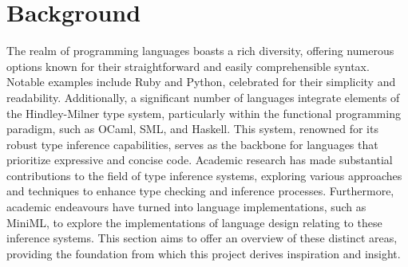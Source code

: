 \documentclass{l4proj}
\begin{document}

    


\chapter{Background}

The realm of programming languages boasts a rich diversity, offering numerous options known for their straightforward and easily comprehensible syntax.
Notable examples include Ruby and Python, celebrated for their simplicity and readability.
Additionally, a significant number of languages integrate elements of the Hindley-Milner type system, particularly within the functional programming paradigm, such as OCaml, SML, and Haskell.
This system, renowned for its robust type inference capabilities, serves as the backbone for languages that prioritize expressive and concise code.
Academic research has made substantial contributions to the field of type inference systems, exploring various approaches and techniques to enhance type checking and inference processes.
Furthermore, academic endeavours have turned into language implementations, such as MiniML, to explore the implementations of language design relating to these inference systems.
This section aims to offer an overview of these distinct areas, providing the foundation from which this project derives inspiration and insight.

\end{document}
